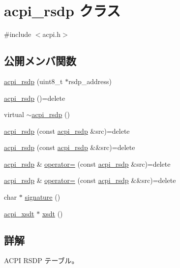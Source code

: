 \hypertarget{classacpi__rsdp}{}\section{acpi\+\_\+rsdp クラス}
\label{classacpi__rsdp}


{\ttfamily \#include $<$acpi.\+h$>$}

\subsection*{公開メンバ関数}
\begin{DoxyCompactItemize}
\item 
\hyperlink{classacpi__rsdp_a1d261f44c3678f4986679e230b4b09c4}{acpi\+\_\+rsdp} (uint8\+\_\+t $\ast$rsdp\+\_\+address)
\item 
\hyperlink{classacpi__rsdp_a054a922cb58cc17206ecdb0d3d1a85d9}{acpi\+\_\+rsdp} ()=delete
\item 
virtual \hyperlink{classacpi__rsdp_a98f9d6ee90c359457ecc9193ccb33299}{$\sim$acpi\+\_\+rsdp} ()
\item 
\hyperlink{classacpi__rsdp_a120265388dd84dbc6fb69ecb94d49eb1}{acpi\+\_\+rsdp} (const \hyperlink{classacpi__rsdp}{acpi\+\_\+rsdp} \&src)=delete
\item 
\hyperlink{classacpi__rsdp_a90d04a5ea31ef4a9c8c03dad7da1c87b}{acpi\+\_\+rsdp} (const \hyperlink{classacpi__rsdp}{acpi\+\_\+rsdp} \&\&src)=delete
\item 
\hyperlink{classacpi__rsdp}{acpi\+\_\+rsdp} \& \hyperlink{classacpi__rsdp_a837f521b7a9ea61afaa32c0f65580a78}{operator=} (const \hyperlink{classacpi__rsdp}{acpi\+\_\+rsdp} \&src)=delete
\item 
\hyperlink{classacpi__rsdp}{acpi\+\_\+rsdp} \& \hyperlink{classacpi__rsdp_a8ced51610f5b4769fc89e222a866bf5a}{operator=} (const \hyperlink{classacpi__rsdp}{acpi\+\_\+rsdp} \&\&src)=delete
\item 
char $\ast$ \hyperlink{classacpi__rsdp_a00665758ce838d3834c63fd0464e170f}{signature} ()
\item 
\hyperlink{classacpi__xsdt}{acpi\+\_\+xsdt} $\ast$ \hyperlink{classacpi__rsdp_a466b4f6a7be1d7d6c20376bade914d2f}{xsdt} ()
\end{DoxyCompactItemize}


\subsection{詳解}
A\+C\+PI R\+S\+DP テーブル。 

